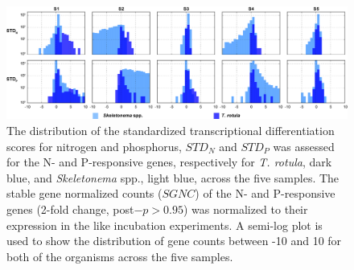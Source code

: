 \begin{landscape}
   \centering
   \null         %
   \vfill        %

	\begin{figure}
  	\centering
    	\includegraphics[width=1.3\textwidth]{Images/C3_STD_Histograms.png}
    	\caption[Distribution of $STD$ scores for N- and P-responsive genes]{The distribution of the standardized transcriptional differentiation scores for nitrogen and phosphorus, $STD_N$ and $STD_P$ was assessed for the N- and P-responsive genes, respectively for \textit{T. rotula}, dark blue, and \textit{Skeletonema} spp., light blue, across the five samples. The stable gene normalized counts ($SGNC$) of the N- and P-responsive genes (2-fold change, post$-p > 0.95$) was normalized to their expression in the like incubation experiments. A semi-log plot is used to show the distribution of gene counts between -10 and 10 for both of the organisms across the five samples.}
  	\label{fig:a3f9}
	\end{figure}
    \vfill        %
\end{landscape}







